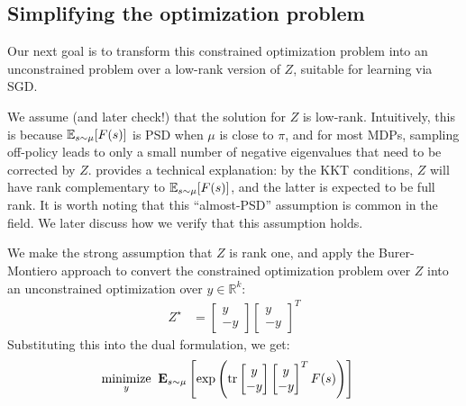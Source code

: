 \subsection{Simplifying the optimization problem}

Our next goal is to transform this constrained optimization problem into an unconstrained problem over a low-rank version of $Z$, suitable for learning via SGD.

We assume (and later check!) that the solution for $Z$ is low-rank. Intuitively, this is because $\mathbb{E}_{s\sim\mu}[F(s)]$ is PSD when $\mu$ is close to $\pi$, and for most MDPs, sampling off-policy leads to only a small number of negative eigenvalues that need to be corrected by $Z$. \citet{kolter2011fixed} provides a technical explanation: by the KKT conditions, $Z$ will have rank complementary to $\mathbb{E}_{s\sim\mu}[F(s)]$, and the latter is expected to be full rank. It is worth noting that this ``almost-PSD'' assumption is common in the field. We later discuss how we verify that this assumption holds.

We make the strong assumption that $Z$ is rank one, and apply the Burer-Montiero approach \citep{burer2003nonlinear} to convert the constrained optimization problem over $Z$ into an unconstrained optimization over $y\in \mathbb R^{k}$:
\begin{align}
  Z^\star & = \begin{bmatrix} y \\ -y \end{bmatrix} \begin{bmatrix} y \\ -y\end{bmatrix}^T
\end{align}
Substituting this into the dual formulation, we get:
\begin{align}
  \underset{y}{\text{minimize}} & \;\; \mathbf{E}_{s\sim\mu} \left [ \exp\left (\text{tr}  \begin{bmatrix} y \\ -y \end{bmatrix} \begin{bmatrix} y \\ -y\end{bmatrix}^T F(s) \right )  \right ]
\end{align}

